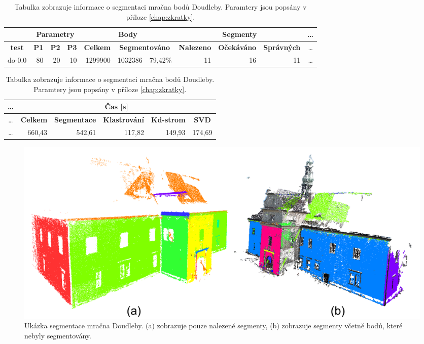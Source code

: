 \documentclass[11pt,twoside,a4paper]{book}
\begin{document}
\begin{table}[ht]
\resizebox{\textwidth}{!} {
\begin{tabular}{|r|r|r|r|r|r|r|r|r|r|c|}
\hline
\textbf{} & \multicolumn{ 3}{c|}{\textbf{Parametry}} & \multicolumn{ 3}{c|}{\textbf{Body}} & \multicolumn{ 3}{c|}{\textbf{Segmenty}} &\ldots\\ \hline
\multicolumn{1}{|c|}{\textbf{test}} & \textbf{P1} & \multicolumn{1}{c|}{\textbf{P2}} & \multicolumn{1}{c|}{\textbf{P3}} & \textbf{Celkem} & \multicolumn{ 2}{c|}{\textbf{Segmentováno}} & \textbf{Nalezeno} & \multicolumn{1}{c|}{\textbf{Očekáváno }} & \multicolumn{1}{c|}{\textbf{Správných}} &\ldots\\ \hline
do-0.0 & \multicolumn{1}{r|}{80} & \multicolumn{1}{r|}{20} & \multicolumn{1}{r|}{10} & \multicolumn{1}{r|}{1299900} & \multicolumn{1}{r|}{1032386} & \multicolumn{1}{r|}{79,42\%} & \multicolumn{1}{r|}{11} & \multicolumn{1}{r|}{16} & \multicolumn{1}{r|}{11} &\ldots\\ \hline
\end{tabular}
}
\begin{flushright} \scalebox{0.9} {
\begin{tabular}{|c|r|r|r|r|r|}
\hline
\ldots& \multicolumn{ 5}{|c|}{\textbf{Čas [s]}} \\ \hline
\ldots& \textbf{Celkem} & \multicolumn{1}{c|}{\textbf{Segmentace}} & \multicolumn{1}{c|}{\textbf{Klastrování}} & \multicolumn{1}{c|}{\textbf{Kd-strom}} & \multicolumn{1}{c|}{\textbf{SVD}} \\ \hline
\ldots& \multicolumn{1}{|r|}{660,43} & \multicolumn{1}{r|}{542,61} & \multicolumn{1}{r|}{117,82} & \multicolumn{1}{r|}{149,93} & \multicolumn{1}{r|}{174,69} \\ \hline
\end{tabular}
}\end{flushright}

\caption{Tabulka zobrazuje informace o segmentaci mračna bodů Doudleby. Paramtery jsou popsány v příloze \ref{chap:zkratky}.} 
\label{table:test-do}
\end{table}

\begin{figure}[ht]
\begin{center}
\includegraphics[width=\textwidth]{figures/test-do}
\caption{Ukázka segmentace mračna Doudleby. (a) zobrazuje pouze nalezené segmenty, (b) zobrazuje segmenty včetně bodů, které nebyly segmentovány.}
\label{fig:test-do}
\end{center}
\end{figure}
\end{document}
